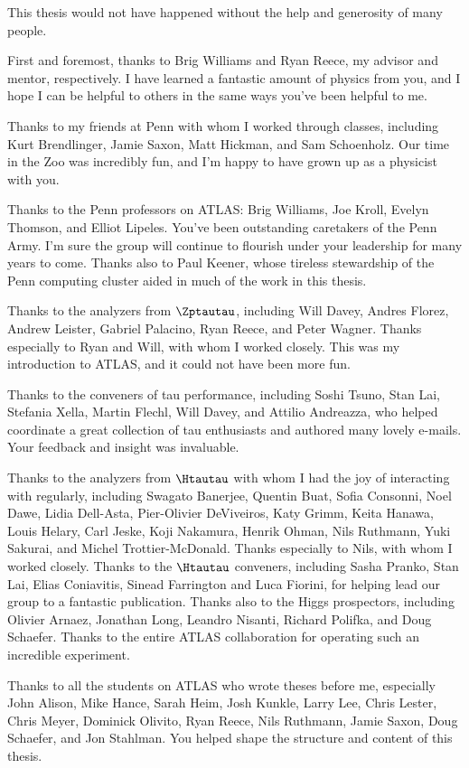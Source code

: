 
This thesis would not have happened without the help and generosity of many people.

First and foremost, thanks to Brig Williams and Ryan Reece, my advisor and mentor, respectively. I have learned a fantastic amount of physics from you, and I hope I can be helpful to others in the same ways you've been helpful to me.

Thanks to my friends at Penn with whom I worked through classes, including Kurt Brendlinger, Jamie Saxon, Matt Hickman, and Sam Schoenholz. Our time in the Zoo was incredibly fun, and I'm happy to have grown up as a physicist with you.

Thanks to the Penn professors on ATLAS: Brig Williams, Joe Kroll, Evelyn Thomson, and Elliot Lipeles. You've been outstanding caretakers of the Penn Army. I'm sure the group will continue to flourish under your leadership for many years to come. Thanks also to Paul Keener, whose tireless stewardship of the Penn computing cluster aided in much of the work in this thesis.

Thanks to the analyzers from $\Zptautau$, including Will Davey, Andres Florez, Andrew Leister, Gabriel Palacino, Ryan Reece, and Peter Wagner. Thanks especially to Ryan and Will, with whom I worked closely. This was my introduction to ATLAS, and it could not have been more fun.

Thanks to the conveners of tau performance, including Soshi Tsuno, Stan Lai, Stefania Xella, Martin Flechl, Will Davey, and Attilio Andreazza, who helped coordinate a great collection of tau enthusiasts and authored many lovely e-mails. Your feedback and insight was invaluable.

Thanks to the analyzers from $\Htautau$ with whom I had the joy of interacting with regularly, including Swagato Banerjee, Quentin Buat, Sofia Consonni, Noel Dawe, Lidia Dell-Asta, Pier-Olivier DeViveiros, Katy Grimm, Keita Hanawa, Louis Helary, Carl Jeske, Koji Nakamura, Henrik Ohman, Nils Ruthmann, Yuki Sakurai, and Michel Trottier-McDonald. Thanks especially to Nils, with whom I worked closely. Thanks to the $\Htautau$ conveners, including Sasha Pranko, Stan Lai, Elias Coniavitis, Sinead Farrington and Luca Fiorini, for helping lead our group to a fantastic publication. Thanks also to the Higgs prospectors, including Olivier Arnaez, Jonathan Long, Leandro Nisanti, Richard Polifka, and Doug Schaefer. Thanks to the entire ATLAS collaboration for operating such an incredible experiment.

Thanks to all the students on ATLAS who wrote theses before me, especially John Alison, Mike Hance, Sarah Heim, Josh Kunkle, Larry Lee, Chris Lester, Chris Meyer, Dominick Olivito, Ryan Reece, Nils Ruthmann, Jamie Saxon, Doug Schaefer, and Jon Stahlman. You helped shape the structure and content of this thesis.

